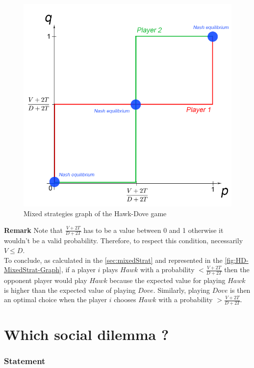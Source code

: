 \documentclass{article}
\begin{document}
\begin{figure}[h]
  \centering
  \includegraphics[scale=0.35]{figures/HD-MixedStrat-Graph.png}
  \caption{Mixed strategies graph of the Hawk-Dove game}
  \label{fig:HD-MixedStrat-Graph}
\end{figure}

\textbf{Remark} Note that $\frac{V+2T}{D+2T}$ has to be a value between 0 and 1 otherwise it wouldn't be a valid probability. Therefore, to respect this condition, necessarily $V \le D $. \\

To conclude, as calculated in the \autoref{sec:mixedStrat} and represented in the \autoref{fig:HD-MixedStrat-Graph}, if a player $i$ plays $Hawk$ with a probability $ <  \frac{V+2T}{D+2T}$ then the opponent player would play $Hawk$ because the expected value for playing $Hawk$ is higher than the expected value of playing $Dove$. Similarly, playing $Dove$ is then an optimal choice when the player $i$ chooses $Hawk$ with a probability $ > \frac{V+2T}{D+2T}$.

\newpage
\section{Which social dilemma ?}

\subsubsection*{Statement}
\end{document}
